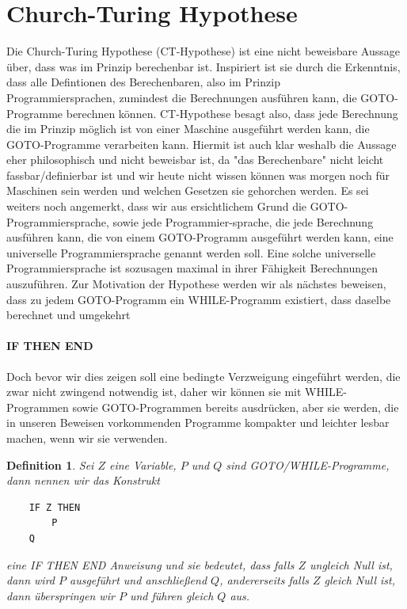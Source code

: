 \documentclass[11pt,a4paper,leqno]{report}
\newtheorem{definition}[theorem]{Definition}
\numberwithin{equation}{chapter}
\begin{document}
\section{Church-Turing Hypothese}
Die Church-Turing Hypothese (CT-Hypothese) ist eine nicht beweisbare Aussage \"uber, dass was im Prinzip berechenbar ist. Inspiriert ist sie durch die Erkenntnis, dass alle Defintionen des Berechenbaren, also im Prinzip \\Programmiersprachen, zumindest die Berechnungen ausf\"uhren kann, die GOTO-Programme berechnen k\"onnen. CT-Hypothese besagt also, dass jede Berechnung die im Prinzip m\"oglich ist von einer Maschine ausgef\"uhrt werden kann, die GOTO-Programme verarbeiten kann. Hiermit ist auch klar weshalb die Aussage eher philosophisch und nicht beweisbar ist, da "das Berechenbare" nicht leicht fassbar/definierbar ist und wir heute nicht wissen k\"onnen was morgen noch f\"ur Maschinen sein werden und welchen Gesetzen sie gehorchen werden. Es sei weiters noch angemerkt, dass wir aus ersichtlichem Grund die GOTO-Programmiersprache, sowie jede Programmier-sprache, die jede Berechnung ausf\"uhren kann, die von einem GOTO-Programm ausgef\"uhrt werden kann, eine universelle Programmiersprache genannt werden soll. Eine solche universelle Programmiersprache ist sozusagen maximal in ihrer F\"ahigkeit Berechnungen auszuf\"uhren. Zur Motivation der Hypothese werden wir als n\"achstes beweisen, dass zu jedem GOTO-Programm ein WHILE-Programm existiert, dass daselbe berechnet und umgekehrt
\paragraph{IF THEN END} Doch bevor wir dies zeigen soll eine bedingte Verzweigung eingef\"uhrt werden, die zwar nicht zwingend notwendig ist, daher wir k\"onnen sie mit WHILE-Programmen sowie GOTO-Programmen bereits ausdr\"ucken, aber sie werden, die in unseren Beweisen vorkommenden Programme kompakter und leichter lesbar machen, wenn wir sie verwenden.
\begin{definition}
Sei $Z$ eine Variable, $P$ und $Q$ sind GOTO/WHILE-Programme, dann nennen wir das Konstrukt
	\begin{lstlisting}
	IF Z THEN
		P
	Q
	\end{lstlisting}
eine IF THEN END Anweisung und sie bedeutet, dass falls $Z$ ungleich Null ist, dann wird $P$ ausgef\"uhrt und anschlie\ss{}end $Q$, andererseits falls $Z$ gleich Null ist, dann \"uberspringen wir $P$ und f\"uhren gleich $Q$ aus.
\end{definition}
\end{document}
